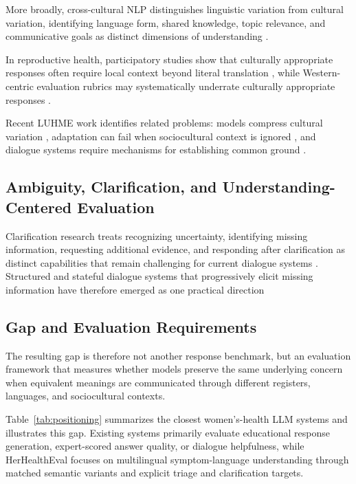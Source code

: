 More broadly, cross-cultural NLP distinguishes linguistic variation from
cultural variation, identifying language form, shared knowledge, topic
relevance, and communicative goals as distinct dimensions of understanding
\citep{hershcovich-etal-2022-challenges,
adilazuarda-etal-2024-towards}.

In reproductive health, participatory studies show that culturally
appropriate responses often require local context beyond literal translation
\citep{deva-etal-2025-family}, while Western-centric evaluation rubrics may
systematically underrate culturally appropriate responses
\citep{dey-etal-2025-beyond}.

Recent LUHME work identifies related problems:
models compress cultural variation
\citep{mohammadi-etal-2025-large},
adaptation can fail when sociocultural context is ignored
\citep{freitas-cardoso-2025-nightmare},
and dialogue systems require mechanisms for establishing common ground
\citep{anikina-etal-2025-building}.


\subsection{Ambiguity, Clarification, and Understanding-Centered Evaluation}

Clarification research treats recognizing uncertainty, identifying missing
information, requesting additional evidence, and responding after
clarification as distinct capabilities that remain challenging for current
dialogue systems
\citep{testoni-fernandez-2024-asking,
zhang-choi-2025-clarify}. Structured and stateful dialogue systems that progressively elicit missing
information have therefore emerged as one practical direction
\citep{demarco-etal-2024-converso}

\subsection{Gap and Evaluation Requirements}
The resulting gap is therefore not another response benchmark, but an evaluation framework that measures whether models preserve the same underlying concern when equivalent meanings are communicated through different registers, languages, and sociocultural contexts.

Table~\ref{tab:positioning} summarizes the closest women's-health LLM systems and illustrates this gap. Existing systems primarily evaluate educational response generation, expert-scored answer quality, or dialogue helpfulness, while HerHealthEval focuses on multilingual symptom-language understanding through matched semantic variants and explicit triage and clarification targets.

